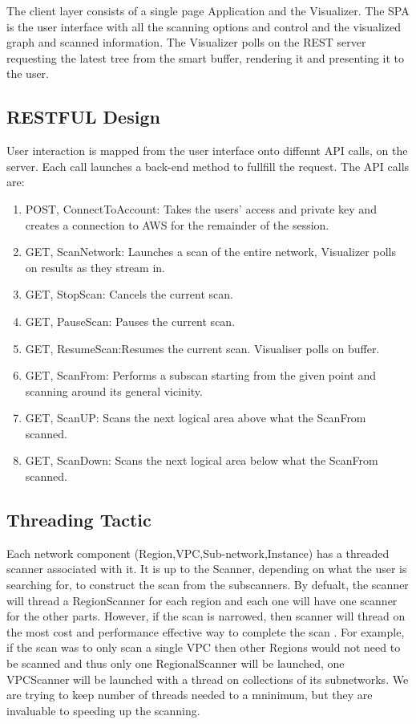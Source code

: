 \documentclass[hidelinks,a4paper,12pt]{article}
\begin{document}
The client layer consists of a single page Application and the Visualizer. The SPA is the user interface with all the scanning options and control and the visualized graph and scanned information. The Visualizer polls on the REST server requesting the latest tree from the smart buffer, rendering it and presenting it to the user.

\subsection{RESTFUL Design}

User interaction is mapped from the user interface onto diffennt API calls, on the server. Each call launches a back-end method to fullfill the request. The API calls are:
\begin{enumerate}  
	\item POST, ConnectToAccount: Takes the users' access and private key and creates a connection to AWS for the remainder of the session.
	\item GET, ScanNetwork: Launches a scan of the entire network, Visualizer polls on results as they stream in. 
	\item GET, StopScan: Cancels the current scan.
	\item GET, PauseScan: Pauses the current scan.
	\item GET, ResumeScan:Resumes the current scan. Visualiser polls on buffer.
	\item GET, ScanFrom: Performs a subscan starting from the given point and scanning around its general vicinity.
	\item GET, ScanUP: Scans the next logical area above what the ScanFrom scanned.
	\item GET, ScanDown: Scans the next logical area below what the ScanFrom scanned.
\end{enumerate}

\subsection{Threading Tactic}
Each network component (Region,VPC,Sub-network,Instance) has a threaded scanner associated with it. It is up to the Scanner, depending on what the user is searching for, to construct the scan from the subscanners.
By defualt, the scanner will thread a RegionScanner for each region and each one will have one scanner for the other parts. However, if the scan is narrowed, then scanner will thread on the most cost and performance effective way to complete the scan . For example, if the scan was to only scan a single VPC then other Regions would not need to be scanned and thus only one RegionalScanner will be launched, one VPCScanner will be launched with a thread on collections of its subnetworks. We are trying to keep number of threads needed to a mninimum, but they are invaluable to speeding up the scanning.  
\end{document}
